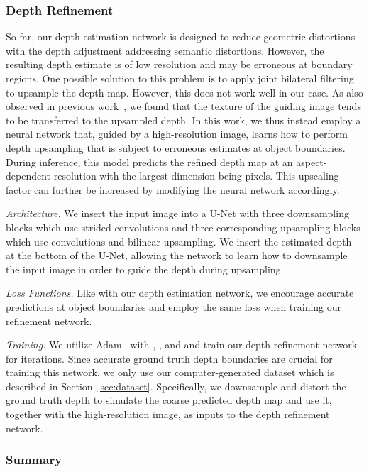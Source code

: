 \documentclass[acmtog,authorversion]{acmart}
\begin{document}
\subsubsection{Depth Refinement}

So far, our depth estimation network is designed to reduce geometric distortions with the depth adjustment addressing semantic distortions. However, the resulting depth estimate is of low resolution and may be erroneous at boundary regions. One possible solution to this problem is to apply joint bilateral filtering to upsample the depth map. However, this does not work well in our case. As also observed in previous work~\cite{Yijunli_ECCV_2016}, we found that the texture of the guiding image tends to be transferred to the upsampled depth. In this work, we thus instead employ a neural network that, guided by a high-resolution image, learns how to perform depth upsampling that is subject to erroneous estimates at object boundaries. During inference, this model predicts the refined depth map at an aspect-dependent resolution with the largest dimension being  pixels. This upscaling factor can further be increased by modifying the neural network accordingly.

\textit{Architecture.} We insert the input image into a U-Net with three downsampling blocks which use strided convolutions and three corresponding upsampling blocks which use convolutions and bilinear upsampling. We insert the estimated depth at the bottom of the U-Net, allowing the network to learn how to downsample the input image in order to guide the depth during upsampling.

\textit{Loss Functions.} Like with our depth estimation network, we encourage accurate predictions at object boundaries and employ the same  loss when training our refinement network.

\textit{Training.} We utilize Adam~\cite{Kingma_ARXIV_2014} with , , and  and train our depth refinement network for  iterations. Since accurate ground truth depth boundaries are crucial for training this network, we only use our computer-generated dataset which is described in Section~\ref{sec:dataset}. Specifically, we downsample and distort the ground truth depth to simulate the coarse predicted depth map and use it, together with the high-resolution image, as inputs to the depth refinement network.

\subsubsection{Summary}
\end{document}
